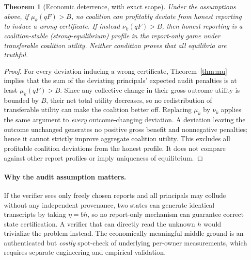 \documentclass[10pt,a4paper]{article}
\newtheorem{theorem}{Theorem}
\begin{document}
\begin{theorem}[Economic deterrence, with exact scope]\label{thm:deterrence}
Under the assumptions above, if $\mu_k(qF)>B$, no coalition can profitably deviate from honest reporting \emph{to induce a wrong certificate}. If instead $\nu_k(qF)>B$, then honest reporting is a coalition-stable (strong-equilibrium) profile in the report-only game under transferable coalition utility. Neither condition proves that \emph{all} equilibria are truthful.
\end{theorem}
\begin{proof}
For every deviation inducing a wrong certificate, Theorem~\ref{thm:mu} implies that the sum of the deviating principals' expected audit penalties is at least $\mu_k(qF)>B$. Since any collective change in their gross outcome utility is bounded by $B$, their net total utility decreases, so no redistribution of transferable utility can make the coalition better off. Replacing $\mu_k$ by $\nu_k$ applies the same argument to \emph{every} outcome-changing deviation. A deviation leaving the outcome unchanged generates no positive gross benefit and nonnegative penalties; hence it cannot strictly improve aggregate coalition utility. This excludes all profitable coalition deviations from the honest profile. It does not compare against other report profiles or imply uniqueness of equilibrium.\end{proof}

\paragraph{Why the audit assumption matters.} If the verifier sees only freely chosen reports and all principals may collude without any independent provenance, two states can generate identical transcripts by taking $\eta=bh$, so no report-only mechanism can guarantee correct state certification. A verifier that can directly read the unknown $h$ would trivialize the problem instead. The economically meaningful middle ground is an authenticated but \emph{costly} spot-check of underlying per-owner measurements, which requires separate engineering and empirical validation.
\end{document}
